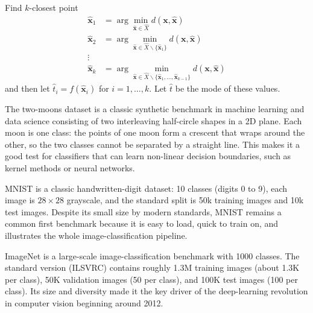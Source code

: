 \documentclass[a4paper, 12pt]{book}
\begin{document}
\begin{problem}
    Find $k$-closest point
    \begin{align}
        \hat{\mathbf{x}}_1 &= \arg\min_{\hat{\mathbf{x}} \in \hat{X}} d(\mathbf{x}, \hat{\mathbf{x}}) \\
    \hat{\mathbf{x}}_2 &= \arg\min_{\hat{\mathbf{x}} \in \hat{X} \backslash \{\hat{\mathbf{x}}_1\}} d(\mathbf{x}, \hat{\mathbf{x}}) \\
                \vdots \\
    \hat{\mathbf{x}}_k &= \arg\min_{\hat{\mathbf{x}} \in \hat{X} \backslash \{\hat{\mathbf{x}}_1, \ldots, \hat{\mathbf{x}}_{k-1}\}} d(\mathbf{x}, \hat{\mathbf{x}})
   \end{align}
   and then let $\hat{t}_i = f(\hat{\mathbf{x}}_i)$ for $i = 1, \ldots, k$. Let $\hat{t}$ be the mode of these values.
\end{problem}


\begin{example}
    The two-moons dataset is a classic synthetic benchmark in machine learning and data science consisting of two interleaving half-circle shapes in a 2D plane. Each moon is one class: the points of one moon form a crescent that wraps around the other, so the two classes cannot be separated by a straight line. This makes it a good test for classifiers that can learn non-linear decision boundaries, such as kernel methods or neural networks.
\end{example}

\begin{example}
    MNIST is a classic handwritten-digit dataset: 10 classes (digits 0 to 9), each
    image is $28\times28$ grayscale, and the standard split is 50k training images
    and 10k test images. Despite its small size by modern standards, MNIST remains
    a common first benchmark because it is easy to load, quick to train on, and
    illustrates the whole image-classification pipeline.
\end{example}

\begin{example}
    ImageNet is a large-scale image-classification benchmark with 1000 classes. The
    standard version (ILSVRC) contains roughly 1.3M training images (about 1.3K per
    class), 50K validation images (50 per class), and 100K test images (100 per
    class). Its size and diversity made it the key driver of the deep-learning
    revolution in computer vision beginning around 2012.
\end{example}
\end{document}
